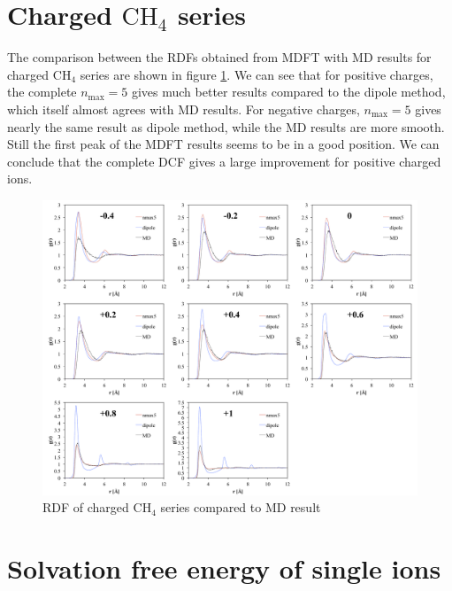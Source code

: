\section{Charged $\mathrm{CH_{4}}$ series}

The comparison between the \acs{RDF}s obtained from \acs{MDFT} with
\acs{MD} results for charged $\mathrm{CH_{4}}$ series are shown
in figure \ref{fig:Comparison-to-MD}. We can see that for positive
charges, the complete $n_{\max}=5$ gives much better results compared
to the dipole method, which itself almost agrees with \acs{MD} results.
For negative charges, $n_{\max}=5$ gives nearly the same result as
dipole method, while the \acs{MD} results are more smooth. Still the
first peak of the \acs{MDFT} results seems to be in a good position.
We can conclude that the complete \acs{DCF} gives a large improvement
for positive charged ions.

\begin{figure}[h]
\begin{centering}
\includegraphics[width=1\columnwidth]{_figure/results/ch4_md}
\par\end{centering}
\caption{\acs{RDF} of charged $\mathrm{CH_{4}}$ series compared to \acs{MD}
result\label{fig:Comparison-to-MD}}
\end{figure}


\section{Solvation free energy of single ions}

